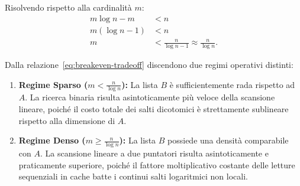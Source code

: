 Risolvendo rispetto alla cardinalità $m$:
\begin{align}
  m \log n - m &< n \nonumber \\
  m (\log n - 1) &< n \nonumber \\
  m &< \frac{n}{\log n - 1} \approx \frac{n}{\log n}.
  \label{eq:breakeven-tradeoff}
\end{align}

\begin{corollary}
Dalla relazione~\eqref{eq:breakeven-tradeoff} discendono due regimi operativi distinti:
\begin{enumerate}
  \item \textbf{Regime Sparso ($m < \frac{n}{\log n}$):} La lista $B$ è sufficientemente rada rispetto ad $A$. La ricerca binaria risulta asintoticamente più veloce della scansione lineare, poiché il costo totale dei salti dicotomici è strettamente sublineare rispetto alla dimensione di $A$.
  \item \textbf{Regime Denso ($m \ge \frac{n}{\log n}$):} La lista $B$ possiede una densità comparabile con $A$. La scansione lineare a due puntatori risulta asintoticamente e praticamente superiore, poiché il fattore moltiplicativo costante delle letture sequenziali in cache batte i continui salti logaritmici non locali.
\end{enumerate}
\end{corollary}

